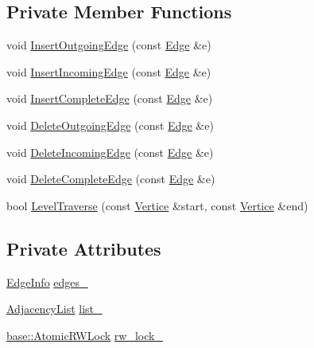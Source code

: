 \subsection*{Private Member Functions}
\begin{DoxyCompactItemize}
\item 
void \hyperlink{classapollo_1_1cyber_1_1service__discovery_1_1Graph_a0011c94b84f1f5019abe9707d27bc64a}{Insert\-Outgoing\-Edge} (const \hyperlink{classapollo_1_1cyber_1_1service__discovery_1_1Edge}{Edge} \&e)
\item 
void \hyperlink{classapollo_1_1cyber_1_1service__discovery_1_1Graph_aac0a755052600861f4d051ae0763e768}{Insert\-Incoming\-Edge} (const \hyperlink{classapollo_1_1cyber_1_1service__discovery_1_1Edge}{Edge} \&e)
\item 
void \hyperlink{classapollo_1_1cyber_1_1service__discovery_1_1Graph_ae1391e8b9baaf33abae6b96c2a4cf4b3}{Insert\-Complete\-Edge} (const \hyperlink{classapollo_1_1cyber_1_1service__discovery_1_1Edge}{Edge} \&e)
\item 
void \hyperlink{classapollo_1_1cyber_1_1service__discovery_1_1Graph_abb689b821a7c124f31f71ab5e1d54560}{Delete\-Outgoing\-Edge} (const \hyperlink{classapollo_1_1cyber_1_1service__discovery_1_1Edge}{Edge} \&e)
\item 
void \hyperlink{classapollo_1_1cyber_1_1service__discovery_1_1Graph_a1db840aa96f7bf1c6d89e528092254cc}{Delete\-Incoming\-Edge} (const \hyperlink{classapollo_1_1cyber_1_1service__discovery_1_1Edge}{Edge} \&e)
\item 
void \hyperlink{classapollo_1_1cyber_1_1service__discovery_1_1Graph_abe4a81fa7390cce8de5232e59a9b5424}{Delete\-Complete\-Edge} (const \hyperlink{classapollo_1_1cyber_1_1service__discovery_1_1Edge}{Edge} \&e)
\item 
bool \hyperlink{classapollo_1_1cyber_1_1service__discovery_1_1Graph_ad335fbccdbe08d2bc5b9b3319a6c951a}{Level\-Traverse} (const \hyperlink{classapollo_1_1cyber_1_1service__discovery_1_1Vertice}{Vertice} \&start, const \hyperlink{classapollo_1_1cyber_1_1service__discovery_1_1Vertice}{Vertice} \&end)
\end{DoxyCompactItemize}
\subsection*{Private Attributes}
\begin{DoxyCompactItemize}
\item 
\hyperlink{classapollo_1_1cyber_1_1service__discovery_1_1Graph_ac45189064420abb326708f92fa17205a}{Edge\-Info} \hyperlink{classapollo_1_1cyber_1_1service__discovery_1_1Graph_a74968952c03f0c041066d7018e9a5d3d}{edges\-\_\-}
\item 
\hyperlink{classapollo_1_1cyber_1_1service__discovery_1_1Graph_a10a571d907b509c8d5026d5209e8edc9}{Adjacency\-List} \hyperlink{classapollo_1_1cyber_1_1service__discovery_1_1Graph_ae41f952e2dd84c01534f193ac3a089fa}{list\-\_\-}
\item 
\hyperlink{classapollo_1_1cyber_1_1base_1_1AtomicRWLock}{base\-::\-Atomic\-R\-W\-Lock} \hyperlink{classapollo_1_1cyber_1_1service__discovery_1_1Graph_a7b06cdf8ac753e9e571b7e5789ad7bc1}{rw\-\_\-lock\-\_\-}
\end{DoxyCompactItemize}


